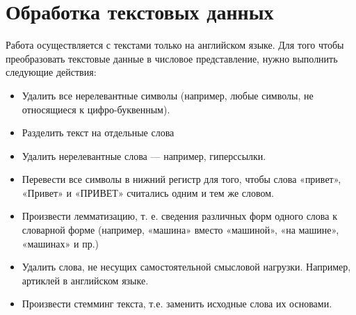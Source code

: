\section{Обработка текстовых данных}

Работа осуществляется с текстами только на английском языке.
Для того чтобы  преобразовать текстовые данные в числовое представление, нужно выполнить следующие действия:

\begin{itemize}
	\item Удалить все нерелевантные символы (например, любые символы, не относящиеся к цифро-буквенным).
	\item Разделить текст на отдельные слова
	\item Удалить нерелевантные слова — например,  гиперссылки.
	\item Перевести все символы в нижний регистр для того, чтобы слова «привет», «Привет» и «ПРИВЕТ» считались одним и тем же словом.

	\item Произвести лемматизацию, т. е. сведения различных форм одного слова к словарной форме (например, «машина» вместо «машиной», «на машине», «машинах» и пр.)
	\item Удалить слова, не несущих самостоятельной смысловой нагрузки. Например, артиклей в английском языке.
	\item Произвести стемминг текста, т.е. заменить исходные слова их основами.

\end{itemize}


